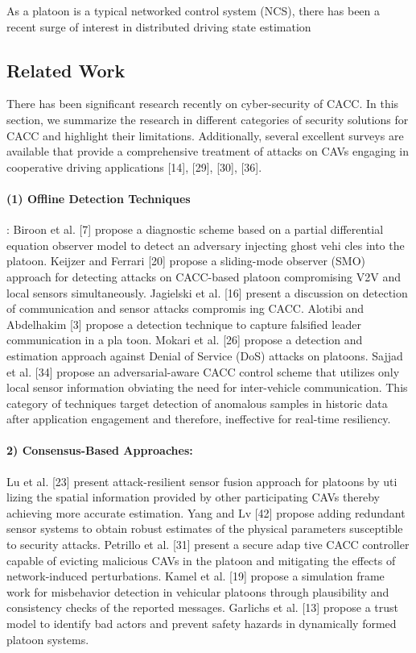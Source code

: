 \documentclass[letterpaper, 10pt, conference]{ieeeconf}  %
\begin{document}
 As a platoon is a typical networked control system (NCS),
 there has been a recent surge of interest in distributed driving
 state estimation

\subsection{Related Work}
There has been significant research recently on
 cyber-security of CACC. In this section, we summarize
 the research in different categories of security solutions for
 CACC and highlight their limitations. Additionally, several
 excellent surveys are available that provide a comprehensive
 treatment of attacks on CAVs engaging in cooperative driving
 applications [14], [29], [30], [36].
 \paragraph*{(1) Offline Detection Techniques}
  : Biroon et al. [7] propose
 a diagnostic scheme based on a partial differential equation
 observer model to detect an adversary injecting ghost vehi
cles into the platoon. Keijzer and Ferrari [20] propose a
 sliding-mode observer (SMO) approach for detecting attacks
 on CACC-based platoon compromising V2V and local sensors
 simultaneously. Jagielski et al. [16] present a discussion on
 detection of communication and sensor attacks compromis
ing CACC. Alotibi and Abdelhakim [3] propose a detection
 technique to capture falsified leader communication in a pla
toon. Mokari et al. [26] propose a detection and estimation
 approach against Denial of Service (DoS) attacks on platoons.
 Sajjad et al. [34] propose an adversarial-aware CACC control
 scheme that utilizes only local sensor information obviating
 the need for inter-vehicle communication. This category of
 techniques target detection of anomalous samples in historic
 data after application engagement and therefore, ineffective
 for real-time resiliency.
 \paragraph*{2) Consensus-Based Approaches:} Lu et al. [23] present
 attack-resilient sensor fusion approach for platoons by uti
lizing the spatial information provided by other participating
 CAVs thereby achieving more accurate estimation. Yang and
 Lv [42] propose adding redundant sensor systems to obtain
 robust estimates of the physical parameters susceptible to
 security attacks. Petrillo et al. [31] present a secure adap
tive CACC controller capable of evicting malicious CAVs
 in the platoon and mitigating the effects of network-induced
 perturbations. Kamel et al. [19] propose a simulation frame
work for misbehavior detection in vehicular platoons through
 plausibility and consistency checks of the reported messages.
 Garlichs et al. [13] propose a trust model to identify bad
 actors and prevent safety hazards in dynamically formed
 platoon systems.
\end{document}
